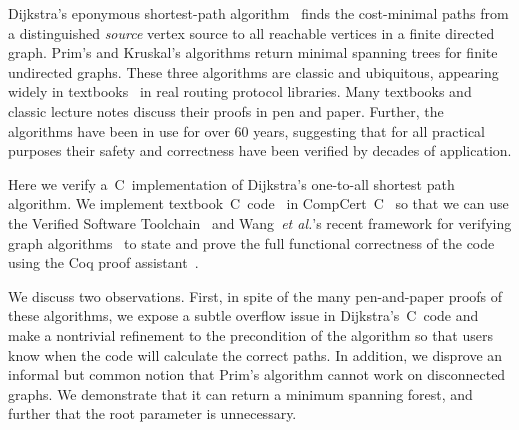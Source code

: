 {\color{red}Dijkstra's eponymous shortest-path algorithm~\cite{DBLP:journals/nm/Dijkstra59} finds
the cost-minimal paths from a distinguished \emph{source} vertex
source to all reachable vertices in a finite directed graph. Prim's and Kruskal's algorithms return minimal spanning trees for finite undirected graphs.
These three algorithms are classic and ubiquitous, appearing widely in textbooks~\cite{clrs} in real routing protocol libraries. Many textbooks and classic lecture notes discuss their proofs in pen and paper. Further, the algorithms have been in
use for over $60$ years, suggesting that for all practical purposes
their safety and correctness have been verified by decades of application.


Here we verify a~C~implementation of Dijkstra's one-to-all shortest path algorithm.
We implement textbook~C~code~\cite{clrs} in CompCert~C~\cite{leroy:compcert} so that
we can use the Verified Software Toolchain~\cite{appel:programlogics} and
Wang~\emph{et al.}'s recent framework for verifying graph algorithms~\cite{DBLP:journals/pacmpl/WangCMH19} to state and prove the full functional
correctness of the code using the Coq proof assistant~\cite{coq}.}

We discuss two observations. First, in spite of the many pen-and-paper proofs of these algorithms, we expose a subtle overflow issue in Dijkstra's~C~code and make a nontrivial refinement to the precondition of the algorithm so that users know when the code will calculate the correct paths. In addition, we disprove an informal but common notion that Prim's algorithm cannot work on disconnected graphs. We demonstrate that it can return a minimum spanning forest, and further that the root parameter is unnecessary.

